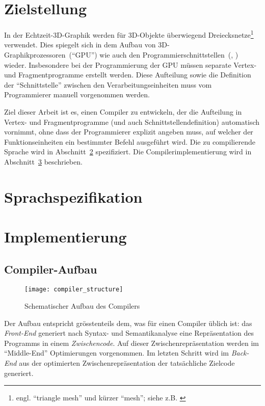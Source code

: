 \documentclass[twoside,a4paper,fleqn,12pt]{article}
\begin{document}
\section{Zielstellung}

In der Echtzeit-3D-Graphik werden für 3D-Objekte überwiegend Dreiecksnetze\footnote{engl. ``triangle mesh'' und kürzer ``mesh''; siehe z.B. \cite{watt_de}}
verwendet. Dies spiegelt sich in dem Aufbau von 3D-Graphikprozessoren~("`GPU"') wie auch
den Programmierschnittstellen~(\cite{glspec4}, \cite{dx10}) wieder. Insbesondere bei der Programmierung der GPU müssen
separate Vertex- und Fragmentprogramme %
erstellt werden. Diese Aufteilung sowie die Definition der "`Schnittstelle"' zwischen den Verarbeitungseinheiten muss vom Programmierer manuell vorgenommen werden.

Ziel dieser Arbeit ist es, einen Compiler zu entwickeln, der die Aufteilung in Vertex- und Fragmentprogramme (und auch Schnittstellendefinition)
automatisch vornimmt,
ohne dass der Programmierer explizit angeben muss, auf welcher der Funktionseinheiten ein bestimmter Befehl ausgeführt wird.
Die zu compilierende Sprache wird in Abschnitt~\ref{langspec} spezifiziert. Die Compilerimplementierung wird in Abschnitt~\ref{implementation}
beschrieben.


\section{Sprachspezifikation}
\label{langspec}



\section{Implementierung}
\label{implementation}

\subsection{Compiler-Aufbau}
\begin{figure}[h]
   \centering
  \texttt{[image: compiler\_structure]}
  \caption{Schematischer Aufbau des Compilers}
  \label{fig:structure}
\end{figure}

Der Aufbau entspricht grösstenteils dem, was für einen Compiler üblich ist: das \emph{Front-End} generiert nach Syntax- und Semantikanalyse
eine Repräsentation des Programms in einem \emph{Zwischencode}. Auf dieser Zwischenrepräsentation werden im "`Middle-End"' %
Optimierungen vorgenommen. Im letzten Schritt wird im \emph{Back-End} aus der optimierten Zwischenrepräsentation der tatsächliche Zielcode generiert.
\end{document}
